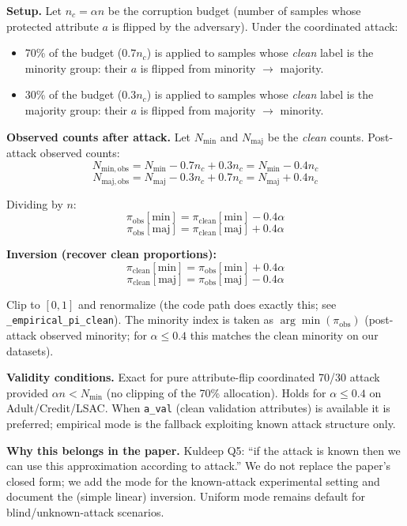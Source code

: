 \documentclass[11pt,a4paper]{article}
\begin{document}
\textbf{Setup.} Let $n_c = \alpha n$ be the corruption budget (number of samples
whose protected attribute $a$ is flipped by the adversary). Under the coordinated
attack:
\begin{itemize}
  \item 70\% of the budget ($0.7 n_c$) is applied to samples whose \emph{clean}
    label is the minority group: their $a$ is flipped from minority $\to$ majority.
  \item 30\% of the budget ($0.3 n_c$) is applied to samples whose \emph{clean}
    label is the majority group: their $a$ is flipped from majority $\to$ minority.
\end{itemize}

\textbf{Observed counts after attack.} Let $N_{\mathrm{min}}$ and $N_{\mathrm{maj}}$
be the \emph{clean} counts. Post-attack observed counts:
\[
N_{\mathrm{min,obs}} = N_{\mathrm{min}} - 0.7 n_c + 0.3 n_c = N_{\mathrm{min}} - 0.4 n_c
\]
\[
N_{\mathrm{maj,obs}} = N_{\mathrm{maj}} - 0.3 n_c + 0.7 n_c = N_{\mathrm{maj}} + 0.4 n_c
\]

Dividing by $n$:
\[
\pi_{\mathrm{obs}}[\mathrm{min}] = \pi_{\mathrm{clean}}[\mathrm{min}] - 0.4 \alpha
\]
\[
\pi_{\mathrm{obs}}[\mathrm{maj}] = \pi_{\mathrm{clean}}[\mathrm{maj}] + 0.4 \alpha
\]

\textbf{Inversion (recover clean proportions):}
\[
\pi_{\mathrm{clean}}[\mathrm{min}] = \pi_{\mathrm{obs}}[\mathrm{min}] + 0.4 \alpha
\]
\[
\pi_{\mathrm{clean}}[\mathrm{maj}] = \pi_{\mathrm{obs}}[\mathrm{maj}] - 0.4 \alpha
\]

Clip to $[0,1]$ and renormalize (the code path does exactly this; see
\texttt{\_empirical\_pi\_clean}). The minority index is taken as $\arg\min(\pi_{\mathrm{obs}})$
(post-attack observed minority; for $\alpha\le 0.4$ this matches the clean minority on our
datasets).

\textbf{Validity conditions.} Exact for pure attribute-flip coordinated 70/30 attack
provided $\alpha n < N_{\mathrm{min}}$ (no clipping of the 70\% allocation). Holds for
$\alpha\le0.4$ on Adult/Credit/LSAC. When \texttt{a\_val} (clean validation attributes)
is available it is preferred; empirical mode is the fallback exploiting known attack
structure only.

\textbf{Why this belongs in the paper.} Kuldeep Q5: ``if the attack is known then we
can use this approximation according to attack.'' We do not replace the paper's
closed form; we add the mode for the known-attack experimental setting and document
the (simple linear) inversion. Uniform mode remains default for blind/unknown-attack
scenarios.
\end{document}
